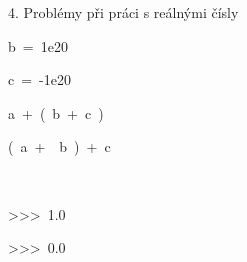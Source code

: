 \documentclass[czech]{beamer}
\newenvironment{lyxcode}
  {\par\begin{list}{}{
    \setlength{\rightmargin}{\leftmargin}
    \setlength{\listparindent}{0pt}%
    \raggedright
    \setlength{\itemsep}{0pt}
    \setlength{\parsep}{0pt}
    \normalfont\ttfamily}%
   \def\{{\char`\{}
   \def\}{\char`\}}
   \def\textasciitilde{\char`\~}
   \item[]}
  {\end{list}}
\begin{document}
\begin{frame}[plain]{4. Problémy při práci s reálnými čísly}
\begin{lyxcode}
{\tiny b~=~1e20}{\tiny\par}

{\tiny c~=~-1e20}{\tiny\par}

{\tiny a~+~(~b~+~c~)}{\tiny\par}

{\tiny (~a~+~~b~)~+~c}{\tiny\par}

{\tiny ~}{\tiny\par}

{\tiny >\textcompwordmark >\textcompwordmark >~1.0~}{\tiny\par}

{\tiny >\textcompwordmark >\textcompwordmark >~0.0}{\tiny\par}
\end{lyxcode}
\end{frame}
\end{document}
